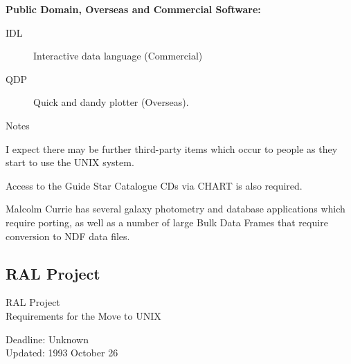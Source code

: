 \newpage
\vspace{5mm}
\begin{center}
{\bf Public Domain, Overseas and Commercial Software:}
\end{center}

\begin{description}
\item[IDL] Interactive data language (Commercial)
\item[QDP] Quick and dandy plotter (Overseas).
\end{description}


\vspace{5mm}
\begin{center}
{\large\sc Notes}
\end{center}

I expect there may be further third-party items which occur to people as they
start to use the UNIX system.

Access to the Guide Star Catalogue CDs via CHART is also required.

Malcolm Currie has several galaxy photometry and database applications which
require porting, as well as a number of large Bulk Data Frames that require
conversion to NDF data files.


\newpage
\subsection{RAL Project}

\renewcommand{\starsitename}{RAL Project}
\renewcommand{\starnodename}{RLVAD}

\renewcommand{\starunixdate}{Unknown}
\renewcommand{\starupdate}{1993 October 26}

\renewcommand{\starsitetelephone}{0235 821900}
\renewcommand{\starsitefax}{0235 445848}

\begin{center}
{\Large\sc \starsitename \\ [2ex]
           Requirements for the Move to UNIX}

\vspace{3mm}
{\large\sc Deadline: \starunixdate \\ [1ex]
           Updated: \starupdate}
\end{center}

\vspace{5mm}

